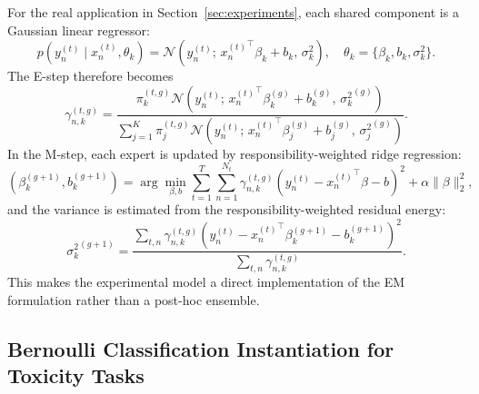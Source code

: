 \documentclass[preprint,12pt]{elsarticle}
\begin{document}
	For the real application in Section~\ref{sec:experiments}, each shared
	component is a Gaussian linear regressor:
	\begin{equation}
		p(y_n^{(t)}\mid x_n^{(t)},\theta_k)
		=
		\mathcal{N}\!\left(
		y_n^{(t)};\,
		{x_n^{(t)}}^\top\beta_k + b_k,\,
		\sigma_k^2
		\right),
		\quad
		\theta_k = \{\beta_k,b_k,\sigma_k^2\}.
		\label{eq:linear_gaussian}
	\end{equation}
	The E-step therefore becomes
	\begin{equation}
		\gamma_{n,k}^{(t,g)}
		=
		\frac{
			\pi_k^{(t,g)}
			\mathcal{N}\!\left(y_n^{(t)};\,{x_n^{(t)}}^\top\beta_k^{(g)}+b_k^{(g)},\,{\sigma_k^2}^{(g)}\right)}
		{\sum_{j=1}^K
			\pi_j^{(t,g)}
			\mathcal{N}\!\left(y_n^{(t)};\,{x_n^{(t)}}^\top\beta_j^{(g)}+b_j^{(g)},\,{\sigma_j^2}^{(g)}\right)}.
		\label{eq:linear_gaussian_estep}
	\end{equation}
	In the M-step, each expert is updated by responsibility-weighted ridge
	regression:
	\begin{equation}
		(\beta_k^{(g+1)},b_k^{(g+1)})
		=
		\arg\min_{\beta,b}
		\sum_{t=1}^T\sum_{n=1}^{N_t}
		\gamma_{n,k}^{(t,g)}
		\left(y_n^{(t)}-{x_n^{(t)}}^\top\beta-b\right)^2
		+\alpha\|\beta\|_2^2 ,
		\label{eq:weighted_ridge_mstep}
	\end{equation}
	and the variance is estimated from the responsibility-weighted residual
	energy:
	\begin{equation}
		{\sigma_k^2}^{(g+1)}
		=
		\frac{\sum_{t,n}\gamma_{n,k}^{(t,g)}
			\left(y_n^{(t)}-{x_n^{(t)}}^\top\beta_k^{(g+1)}-b_k^{(g+1)}\right)^2}
		{\sum_{t,n}\gamma_{n,k}^{(t,g)}}.
		\label{eq:sigma_update}
	\end{equation}
	This makes the experimental model a direct implementation of the EM
	formulation rather than a post-hoc ensemble.
	
	\subsection{Bernoulli Classification Instantiation for Toxicity Tasks}
	\label{sec:bernoulli_toxicity}
	
\end{document}
